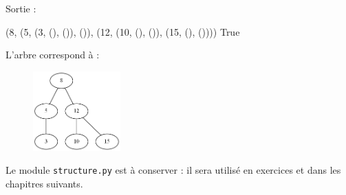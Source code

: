 \documentclass[
  letterpaper,
  DIV=11,
  numbers=noendperiod]{scrartcl}
\newenvironment{Shaded}{\begin{snugshade}}{\end{snugshade}}
\newcommand{\DecValTok}[1]{\textcolor[rgb]{0.68,0.00,0.00}{#1}}
\newcommand{\NormalTok}[1]{\textcolor[rgb]{0.00,0.23,0.31}{#1}}
\newcommand{\VariableTok}[1]{\textcolor[rgb]{0.07,0.07,0.07}{#1}}
\begin{document}
Sortie :

\begin{Shaded}
\begin{Highlighting}[]
\NormalTok{(}\DecValTok{8}\NormalTok{, (}\DecValTok{5}\NormalTok{, (}\DecValTok{3}\NormalTok{, (), ()), ()), (}\DecValTok{12}\NormalTok{, (}\DecValTok{10}\NormalTok{, (), ()), (}\DecValTok{15}\NormalTok{, (), ())))}
\VariableTok{True}
\end{Highlighting}
\end{Shaded}

L'arbre correspond à :

\begin{figure}

{\centering \includegraphics[width=0.3\textwidth,height=\textheight]{arbre.gv.png}

}

\end{figure}

Le module \texttt{structure.py} est à conserver : il sera utilisé en
exercices et dans les chapitres suivants.
\end{document}
